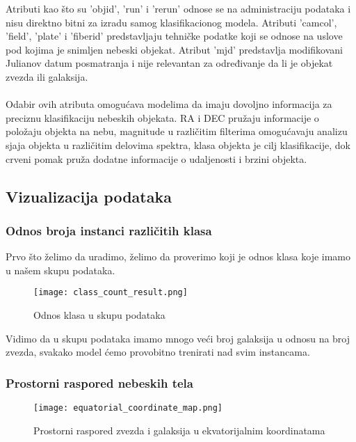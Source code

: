 \documentclass[a4paper,12pt]{article}
\begin{document}
Atributi kao što su 'objid', 'run' i 'rerun' odnose se na administraciju podataka i nisu direktno bitni za izradu samog klasifikacionog modela. Atributi 'camcol', 'field', 'plate' i 'fiberid' predstavljaju tehničke podatke koji se odnose na uslove pod kojima je snimljen nebeski objekat. Atribut 'mjd' predstavlja modifikovani Julianov datum posmatranja i nije relevantan za određivanje da li je objekat zvezda ili galaksija.\\\\
Odabir ovih atributa omogućava modelima da imaju dovoljno informacija za preciznu klasifikaciju nebeskih objekata. RA i DEC pružaju informacije o položaju objekta na nebu, magnitude u različitim filterima omogućavaju analizu sjaja objekta u različitim delovima spektra, klasa objekta je cilj klasifikacije, dok crveni pomak pruža dodatne informacije o udaljenosti i brzini objekta.

\clearpage

\subsection{Vizualizacija podataka}

\subsubsection{Odnos broja instanci različitih klasa}
Prvo što želimo da uradimo, želimo da proverimo koji je odnos klasa koje imamo u našem skupu podataka.

\begin{figure}[h!]
\centering
\texttt{[image: class\_count\_result.png]}
\caption{Odnos klasa u skupu podataka}
\label{fig:sql_query}
\end{figure}

Vidimo da u skupu podataka imamo mnogo veći broj galaksija u odnosu na broj zvezda, svakako model ćemo provobitno trenirati nad svim instancama.

\subsubsection{Prostorni raspored nebeskih tela}

\begin{figure}[h!]
\centering
\texttt{[image: equatorial\_coordinate\_map.png]}
\caption{Prostorni raspored zvezda i galaksija u ekvatorijalnim koordinatama}
\label{fig:equatorial_coordinates}
\end{figure}
\end{document}
